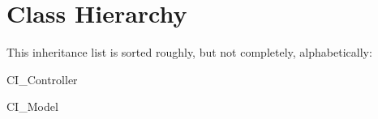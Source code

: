 \section{Class Hierarchy}
This inheritance list is sorted roughly, but not completely, alphabetically\-:\begin{DoxyCompactList}
\item C\-I\-\_\-\-Controller\begin{DoxyCompactList}
\item {}
\end{DoxyCompactList}
\item C\-I\-\_\-\-Model\begin{DoxyCompactList}
\item {}
\item {}
\item {}
\end{DoxyCompactList}
\end{DoxyCompactList}

